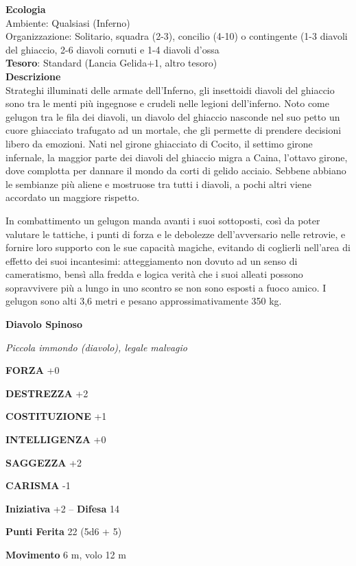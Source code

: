 \begin{multicols}{2}
	\textbf{Ecologia}\\
	Ambiente: Qualsiasi (Inferno)\\
	Organizzazione: Solitario, squadra (2-3), concilio (4-10) o contingente (1-3 diavoli del ghiaccio, 2-6 diavoli cornuti e 1-4 diavoli d'ossa\\
	\textbf{Tesoro}: Standard (Lancia Gelida+1, altro tesoro)\\
	\textbf{Descrizione}\\
	Strateghi illuminati delle armate dell'Inferno, gli insettoidi diavoli del ghiaccio sono tra le menti più ingegnose e crudeli nelle legioni dell'inferno. Noto come gelugon tra le fila dei diavoli, un diavolo del ghiaccio nasconde nel suo petto un cuore ghiacciato trafugato ad un mortale, che gli permette di prendere decisioni libero da emozioni. Nati nel girone ghiacciato di Cocito, il settimo girone infernale, la maggior parte dei diavoli del ghiaccio migra a Caina, l'ottavo girone, dove complotta per dannare il mondo da corti di gelido acciaio. Sebbene abbiano le sembianze più aliene e mostruose tra tutti i diavoli, a pochi altri viene accordato un maggiore rispetto.

	In combattimento un gelugon manda avanti i suoi sottoposti, così da poter valutare le tattiche, i punti di forza e le debolezze dell'avversario nelle retrovie, e fornire loro supporto con le sue capacità magiche, evitando di coglierli nell'area di effetto dei suoi incantesimi: atteggiamento non dovuto ad un senso di cameratismo, bensì alla fredda e logica verità che i suoi alleati possono sopravvivere più a lungo in uno scontro se non sono esposti a fuoco amico. I gelugon sono alti 3,6 metri e pesano approssimativamente 350 kg.


	\medskip{}\textbf{Diavolo Spinoso}

	\textit{Piccola immondo (diavolo), legale malvagio}

	\textbf{FORZA} +0

	\textbf{DESTREZZA} +2

	\textbf{COSTITUZIONE} +1

	\textbf{INTELLIGENZA} +0

	\textbf{SAGGEZZA} +2

	\textbf{CARISMA} -1

	\textbf{Iniziativa} +2 -- \textbf{Difesa} 14

	\textbf{Punti Ferita} 22 (5d6 + 5)

	\textbf{Movimento} 6 m, volo 12 m


\end{multicols}
